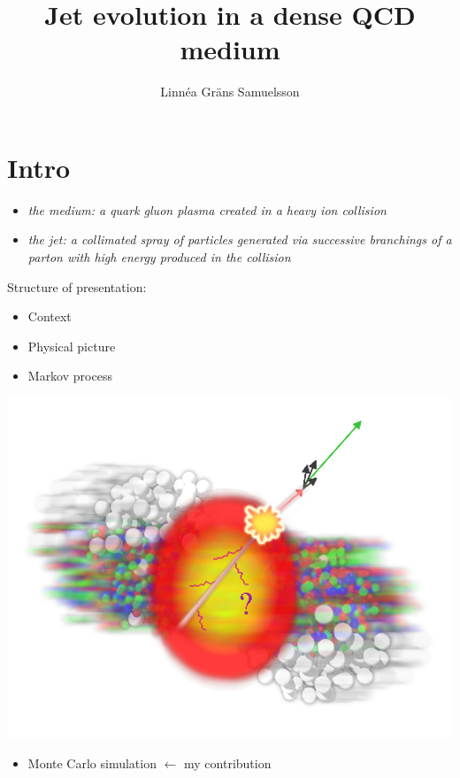 \documentclass[pstricks,mathserif]{beamer}
\title{Jet evolution in a dense QCD medium}
\author{Linnéa Gräns Samuelsson}
\institute %
{
  Internship at CEA Saclay\\
  Supervisors: Edmond Iancu and Gregory Soyez
}
\begin{document}
\frame{\titlepage}


\section{Intro}

\begin{frame}


\endminipage\hfill
{}
\begin{itemize}
\item \emph{the medium: a quark gluon plasma created in a heavy ion collision}
\item \emph{the jet: a collimated spray of particles generated via successive branchings of a parton with high energy produced in the collision}
\end{itemize}
\endminipage\hfill



\vspace*{1cm}
Structure of presentation:

\begin{itemize}
\item Context
\item Physical picture
\item Markov process
\end{itemize}
\endminipage\hfill
{}
\includegraphics[width=0.9\linewidth]{jet-quenching.jpg}
\endminipage\hfill
\vspace*{-0.25cm}
\begin{itemize}
\item Monte Carlo simulation $\leftarrow$ my contribution
\end{itemize}
\vspace*{1cm}

\end{frame}
\end{document}
